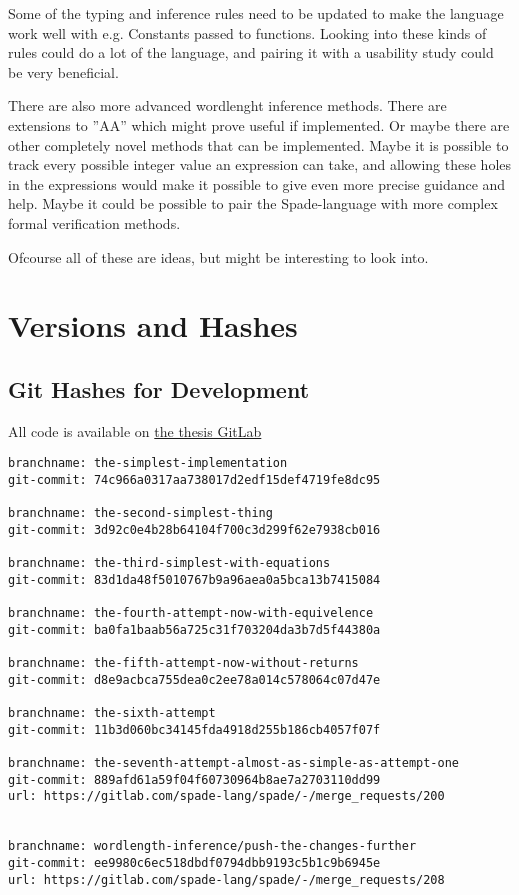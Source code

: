 \documentclass[msc,lith,english]{liuthesis}
\begin{document}
Some of the typing and inference rules need to be updated to make the language work well with e.g. Constants passed to functions. Looking into these kinds of rules could do a lot of the language, and pairing it with a usability study could be very beneficial.

There are also more advanced wordlenght inference methods. There are extensions to ''AA'' which might prove useful if implemented. Or maybe there are other completely novel methods that can be implemented. Maybe it is possible to track every possible integer value an expression can take, and allowing these holes in the expressions would make it possible to give even more precise guidance and help. Maybe it could be possible to pair the Spade-language with more complex formal verification methods.

Ofcourse all of these are ideas, but might be interesting to look into.

\clearpage

\printbibliography

\appendix
\chapter{Versions and Hashes}
\label{app:VersionsAndGitHashes}
\section{Git Hashes for Development}
All code is available on \href{https://gitlab.com/FredTheDino/spade}{the thesis GitLab}
\begin{verbatim}
branchname: the-simplest-implementation
git-commit: 74c966a0317aa738017d2edf15def4719fe8dc95

branchname: the-second-simplest-thing
git-commit: 3d92c0e4b28b64104f700c3d299f62e7938cb016

branchname: the-third-simplest-with-equations
git-commit: 83d1da48f5010767b9a96aea0a5bca13b7415084

branchname: the-fourth-attempt-now-with-equivelence
git-commit: ba0fa1baab56a725c31f703204da3b7d5f44380a

branchname: the-fifth-attempt-now-without-returns
git-commit: d8e9acbca755dea0c2ee78a014c578064c07d47e

branchname: the-sixth-attempt
git-commit: 11b3d060bc34145fda4918d255b186cb4057f07f

branchname: the-seventh-attempt-almost-as-simple-as-attempt-one
git-commit: 889afd61a59f04f60730964b8ae7a2703110dd99
url: https://gitlab.com/spade-lang/spade/-/merge_requests/200


branchname: wordlength-inference/push-the-changes-further
git-commit: ee9980c6ec518dbdf0794dbb9193c5b1c9b6945e
url: https://gitlab.com/spade-lang/spade/-/merge_requests/208
\end{verbatim}
\end{document}

